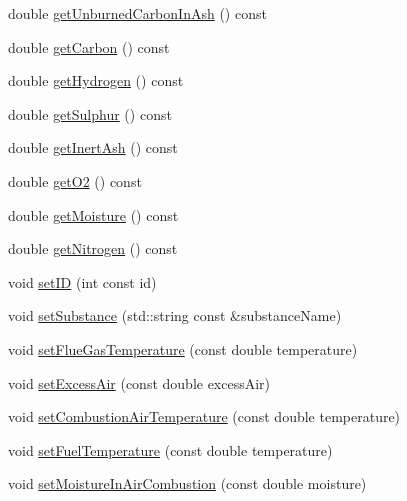\begin{DoxyCompactItemize}
\item 
double \hyperlink{class_solid_liquid_flue_gas_material_a53ac34a949168a35297ab3afb9eb2c7b}{get\+Unburned\+Carbon\+In\+Ash} () const
\item 
double \hyperlink{class_solid_liquid_flue_gas_material_a7b8a98111943d30094e2d6950f7f2ec1}{get\+Carbon} () const
\item 
double \hyperlink{class_solid_liquid_flue_gas_material_a26af2edd53c50b071648d03bc6442fb6}{get\+Hydrogen} () const
\item 
double \hyperlink{class_solid_liquid_flue_gas_material_abe35d8ff283bfa5aadcf00f9906025ae}{get\+Sulphur} () const
\item 
double \hyperlink{class_solid_liquid_flue_gas_material_a0549b32b7b5423267d5f59cc96b98127}{get\+Inert\+Ash} () const
\item 
double \hyperlink{class_solid_liquid_flue_gas_material_a08d588e576f605d3f9925cb649e1105e}{get\+O2} () const
\item 
double \hyperlink{class_solid_liquid_flue_gas_material_accf3c8be942d0ba244f6eabab6e7012b}{get\+Moisture} () const
\item 
double \hyperlink{class_solid_liquid_flue_gas_material_a76159a5d9d609f0e0131f7bca3b60ebc}{get\+Nitrogen} () const
\item 
void \hyperlink{class_solid_liquid_flue_gas_material_a6046d06703bd496745121b62eab4f40f}{set\+ID} (int const id)
\item 
void \hyperlink{class_solid_liquid_flue_gas_material_a54be915432c1300c4d8eaf7bf2be361f}{set\+Substance} (std\+::string const \&substance\+Name)
\item 
void \hyperlink{class_solid_liquid_flue_gas_material_ae647700dbff5ccea7938b2117f2c3156}{set\+Flue\+Gas\+Temperature} (const double temperature)
\item 
void \hyperlink{class_solid_liquid_flue_gas_material_a7a3f9f77d267afc05f5fde1da9329ec5}{set\+Excess\+Air} (const double excess\+Air)
\item 
void \hyperlink{class_solid_liquid_flue_gas_material_a626dfbc9ba87abff99e5c5a8204d69c6}{set\+Combustion\+Air\+Temperature} (const double temperature)
\item 
void \hyperlink{class_solid_liquid_flue_gas_material_a420ba1234c5f8c4b93f190b61046a589}{set\+Fuel\+Temperature} (const double temperature)
\item 
void \hyperlink{class_solid_liquid_flue_gas_material_a1a5f1bd3008e78cce62edb8aca642284}{set\+Moisture\+In\+Air\+Combustion} (const double moisture)
\item 

\end{DoxyCompactItemize}

